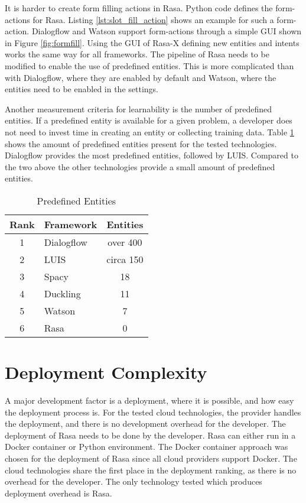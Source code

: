 It is harder to create form filling actions in Rasa.
Python code defines the form-actions for Rasa.
Listing \ref{lst:slot_fill_action} shows an example for such a form-action.
Dialogflow and Watson support form-actions through a simple GUI shown in Figure \ref{fig:formfill}.
Using the GUI of Rasa-X defining new entities and intents works the same way for all frameworks.
The pipeline of Rasa needs to be modified to enable the use of predefined entities.
This is more complicated than with Dialogflow, where they are enabled by default and Watson, where the entities need to be enabled in the settings.

Another measurement criteria for learnability is the number of predefined entities.
If a predefined entity is available for a given problem, a developer does not need to invest time in creating an entity or collecting training data. 
Table \ref{tab:predefined_entities} shows the amount of predefined entities 
present for the tested technologies.
Dialogflow provides the most predefined entities, followed by LUIS.
Compared to the two above the other technologies provide a small amount of predefined entities.
\begin{table}[H]
    \centering
    \begin{tabular}{ c | l | c }
        Rank & Framework &  Entities \\ \hline \hline
        1 & \multirow{1}{*}{Dialogflow} & over 400 \\
        2 & \multirow{1}{*}{LUIS} & circa 150 \\
        3 & \multirow{1}{*}{Spacy} & 18 \\
        4 & \multirow{1}{*}{Duckling} & 11 \\
        5 & \multirow{1}{*}{Watson} & 7  \\
        6 & \multirow{1}{*}{Rasa} & 0 \\
    \end{tabular}
    \caption{Predefined Entities} \label{tab:predefined_entities}
\end{table} \noindent

\section*{Deployment Complexity}
A major development factor is a deployment, where it is possible, and how easy the deployment process is.
For the tested cloud technologies, the provider handles the deployment, and there is no development overhead for the developer.
The deployment of Rasa needs to be done by the developer.
Rasa can either run in a Docker container or Python environment.
The Docker container approach was chosen for the deployment of Rasa since all cloud providers support Docker.
The cloud technologies share the first place in the deployment ranking, as there is no overhead for the developer.
The only technology tested which produces deployment overhead is Rasa. 

